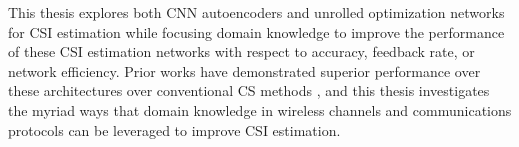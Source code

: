 This thesis explores both CNN autoencoders and unrolled optimization networks for CSI estimation while focusing domain knowledge to improve the performance of these CSI estimation networks with respect to accuracy, feedback rate, or network efficiency. Prior works have demonstrated superior performance over these architectures over conventional CS methods \cite{ref:csinet,ref:Guo2022FISTANet}, and this thesis investigates the myriad ways that domain knowledge in wireless channels and communications protocols can be leveraged to improve CSI estimation.

